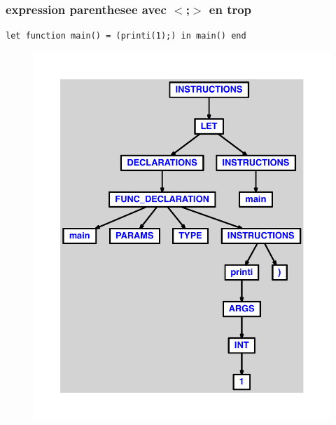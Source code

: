 \documentclass{article}
\begin{document}
\subsubsection{expression parenthesee avec $ < $;$ > $ en trop}
\begin{lstlisting}
let function main() = (printi(1);) in main() end
\end{lstlisting}
\newpage
\begin{figure}[H]
\centering
\includegraphics[max width=\textwidth]{ast/ast_34.pdf}
\end{figure}
\newpage
\end{document}

